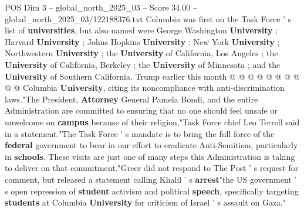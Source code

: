 \begin{textsample}{POS Dim 3 – global\_north\_2025\_03 – Score 34.00 – global\_north\_2025\_03/122188376.txt}
Columbia was first on the Task Force ' s list of \textbf{universities}, but also named were George Washington \textbf{University} ; Harvard \textbf{University} ; Johns Hopkins \textbf{University} ; New York \textbf{University} ; Northwestern \textbf{University} ; the \textbf{University} of California, Los Angeles ; the \textbf{University} of California, Berkeley ; the \textbf{University} of Minnesota ; and the \textbf{University} of Southern California.
Trump earlier this month @ @ @ @ @ @ @ @ @ @ Columbia \textbf{University}, citing its noncompliance with anti-discrimination laws."The President, \textbf{Attorney} General Pamela Bondi, and the entire Administration are committed to ensuring that no one should feel unsafe or unwelcome on \textbf{campus} because of their religion,"Task Force chief Leo Terrell said in a statement."The Task Force ' s mandate is to bring the full force of the \textbf{federal} government to bear in our effort to eradicate Anti-Semitism, particularly in \textbf{schools}.
These visits are just one of many steps this Administration is taking to deliver on that commitment."Greer did not respond to The Post ' s request for comment, but released a statement calling Khalil ' s \textbf{arrest}"the US government ' s open repression of \textbf{student} activism and political \textbf{speech}, specifically targeting \textbf{students} at Columbia \textbf{University} for criticism of Israel ' s assault on Gaza."

\end{textsample}
